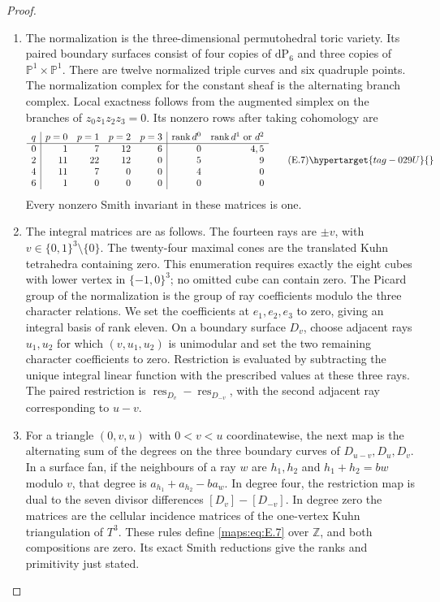 \begin{proof}
\begin{enumerate}[label={$\langle1\rangle$\arabic*.},leftmargin=*]
\item The normalization is the three-dimensional permutohedral toric variety.
Its paired boundary surfaces consist of four copies of $\mathrm{dP}_6$
and three copies of $\mathbb P^1\times\mathbb P^1$.  There are twelve
normalized triple curves and six quadruple points.  The normalization
complex for the constant sheaf is the alternating branch complex.
Local exactness follows from the augmented simplex on the branches
of $z_0z_1z_2z_3=0$.  Its nonzero rows after taking cohomology are
\[
\begin{array}{c|rrrr|rr}
q& p=0&p=1&p=2&p=3&\operatorname{rank}d^0&
 \operatorname{rank}d^1\ \text{or }d^2\\ \hline
0&1&7&12&6&0&4,5\\
2&11&22&12&0&5&9\\
4&11&7&0&0&4&0\\
6&1&0&0&0&0&0
\end{array}
\tag{E.7}\hypertarget{tag-029U}{}\label{maps:eq:E.7}
\]
Every nonzero Smith invariant in these matrices is one.

\item The integral matrices are as follows.
The fourteen rays are $\pm v$, with
$v\in\{0,1\}^3\setminus\{0\}$.  The twenty-four maximal cones
are the translated Kuhn tetrahedra containing zero.  This enumeration
requires exactly the eight cubes with lower vertex in $\{-1,0\}^3$;
no omitted cube can contain zero.  The Picard group of the normalization
is the group of ray coefficients modulo the three character relations.
We set the coefficients at $e_1,e_2,e_3$ to zero, giving an integral
basis of rank eleven.  On a boundary surface $D_v$, choose adjacent
rays $u_1,u_2$ for which $(v,u_1,u_2)$ is unimodular and set the two
remaining character coefficients to zero.  Restriction is evaluated
by subtracting the unique integral linear function with the prescribed
values at these three rays.  The paired restriction is
$\operatorname{res}_{D_v}-\operatorname{res}_{D_{-v}}$, with the
second adjacent ray corresponding to $u-v$.

\item For a triangle $(0,v,u)$ with $0<v<u$ coordinatewise, the next map
is the alternating sum of the degrees on the three boundary curves
of $D_{u-v},D_u,D_v$.  In a surface fan, if the neighbours of a ray
$w$ are $h_1,h_2$ and $h_1+h_2=bw$ modulo $v$, that degree is
$a_{h_1}+a_{h_2}-ba_w$.  In degree four, the restriction map is dual
to the seven divisor differences $[D_v]-[D_{-v}]$.  In degree zero
the matrices are the cellular incidence matrices of the one-vertex
Kuhn triangulation of $T^3$.  These rules define \eqref{maps:eq:E.7} over
$\mathbb Z$, and both compositions are zero.
Its exact Smith reductions give the ranks and primitivity just stated.


\end{enumerate}
\end{proof}
